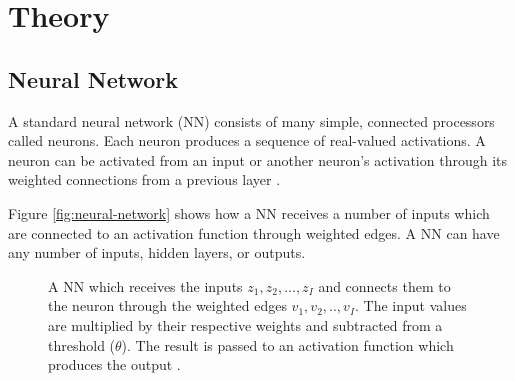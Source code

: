 \section{Theory}

\subsection{Neural Network}

A standard neural network (NN) consists of many simple, connected processors called neurons. Each neuron produces a sequence of real-valued activations. A neuron can be activated from an input or another neuron's activation through its weighted connections from a previous layer \cite{NeuralNetwork}.

Figure \ref{fig:neural-network} shows how a NN receives a number of inputs which are connected to an activation function through weighted edges. A NN can have any number of inputs, hidden layers, or outputs.

\begin{figure}
\centering
{}
\caption{A NN which receives the inputs $z_1, z_2, ..., z_I$ and connects them to the neuron through the weighted edges $v_1, v_2, .., v_I$. The input values are multiplied by their respective weights and subtracted from a threshold ($\theta$). The result is passed to an activation function which produces the output \cite{Engelbrecht}.} \label{neural-network}
\end{figure}

